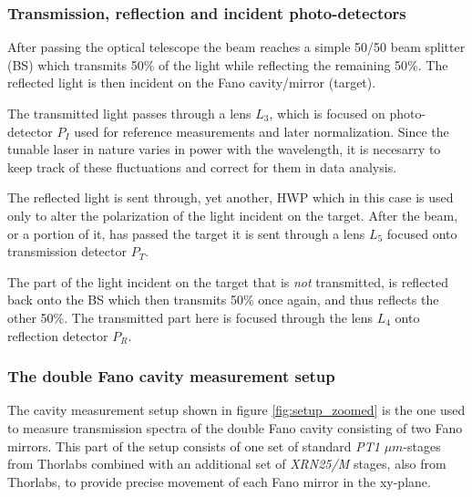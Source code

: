 \subsubsection{Transmission, reflection and incident photo-detectors}

After passing the optical telescope the beam reaches a simple 50/50 beam splitter (BS) which transmits 50\% of the light while reflecting the remaining 50\%. The reflected light is then incident on the Fano cavity/mirror (target). 

The transmitted light passes through a lens $L_3$, which is focused on photo-detector $P_I$ used for reference measurements and later normalization. Since the tunable laser in nature varies in power with the wavelength, it is necesarry to keep track of these fluctuations and correct for them in data analysis. 

The reflected light is sent through, yet another, HWP which in this case is used only to alter the polarization of the light incident on the target. After the beam, or a portion of it, has passed the target it is sent through a lens $L_5$ focused onto transmission detector $P_T$.

The part of the light incident on the target that is \emph{not} transmitted, is reflected back onto the BS which then transmits 50\% once again, and thus reflects the other 50\%. The transmitted part here is focused through the lens $L_4$ onto reflection detector $P_R$.

\subsubsection{The double Fano cavity measurement setup}

The cavity measurement setup shown in figure \ref{fig:setup_zoomed} is the one used to measure transmission spectra of the double Fano cavity consisting of two Fano mirrors. This part of the setup consists of one set of standard \emph{PT1} $\mu m$-stages from Thorlabs\cite{thorlabs_stage1} combined with an additional set of \emph{XRN25/M} stages, also from Thorlabs\cite{thorlabs_stage2}, to provide precise movement of each Fano mirror in the xy-plane. 

